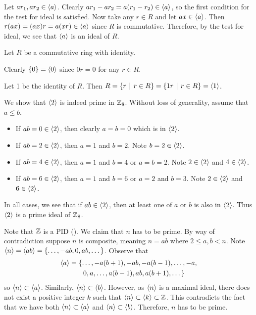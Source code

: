 \begin{questions}
    Let $ar_1, ar_2 \in \left\langle a\right\rangle$. Clearly $ar_1 - ar_2 = a(r_1-r_2) \in \left\langle a\right\rangle$, so the first condition for the test for ideal is satisfied. Now take any $r \in R$ and let $ax \in \left\langle a\right\rangle$. Then $r(ax) = (ax)r = a(xr) \in \left\langle a\right\rangle$ since $R$ is commutative. Therefore, by the test for ideal, we see that $\left\langle a\right\rangle$ is an ideal of $R$.

    \item Let $R$ be a commutative ring with identity.
    \begin{partquestions}{\alph*}
        \item Clearly $\{0\} = \left\langle0\right\rangle$ since $0r = 0$ for any $r \in R$.
        \item Let 1 be the identity of $R$. Then $R = \{r \vert r \in R\} = \{1r \vert r \in R\} = \princ{1}$.
    \end{partquestions}

    \item We show that $\left\langle2\right\rangle$ is indeed prime in $\mathbb{Z}_8$. Without loss of generality, assume that $a \leq b$.
    \begin{itemize}
        \item If $ab = 0 \in \left\langle2\right\rangle$, then clearly $a = b = 0$ which is in $\left\langle2\right\rangle$.
        \item If $ab = 2 \in \left\langle2\right\rangle$, then $a = 1$ and $b = 2$. Note $b = 2 \in \left\langle2\right\rangle$.
        \item If $ab = 4 \in \left\langle2\right\rangle$, then $a = 1$ and $b = 4$ or $a = b = 2$. Note $2 \in \left\langle2\right\rangle$ and $4 \in \left\langle2\right\rangle$.
        \item If $ab = 6 \in \left\langle2\right\rangle$, then $a = 1$ and $b = 6$ or $a = 2$ and $b = 3$. Note $2 \in \left\langle2\right\rangle$ and $6 \in \left\langle2\right\rangle$.
    \end{itemize}
    In all cases, we see that if $ab \in \left\langle2\right\rangle$, then at least one of $a$ or $b$ is also in $\left\langle2\right\rangle$. Thus $\left\langle2\right\rangle$ is a prime ideal of $\mathbb{Z}_8$.

    \item Note that $\mathbb{Z}$ is a PID (). We claim that $n$ has to be prime. By way of contradiction suppose $n$ is composite, meaning $n = ab$ where $2 \leq a,b < n$. Note $\left\langle n\right\rangle = \left\langle ab\right\rangle = \{\dots, -ab, 0, ab, \dots\}$. Observe that
    \begin{align*}
        \left\langle a\right\rangle &= \{\dots, -a(b+1), -ab, -a(b-1), \dots, -a,\\
        &\quad\quad0, a, \dots, a(b-1), ab, a(b+1), \dots\}
    \end{align*}
    so $\left\langle n\right\rangle \subset \left\langle a\right\rangle$. Similarly, $\left\langle n\right\rangle \subset \left\langle b\right\rangle$. However, as $\left\langle n\right\rangle$ is a maximal ideal, there does not exist a positive integer $k$ such that $\left\langle n\right\rangle \subset \left\langle k\right\rangle \subset \mathbb{Z}$. This contradicts the fact that we have both $\left\langle n\right\rangle \subset \left\langle a\right\rangle$ and $\left\langle n\right\rangle \subset \left\langle b\right\rangle$. Therefore, $n$ has to be prime.


\end{questions}
